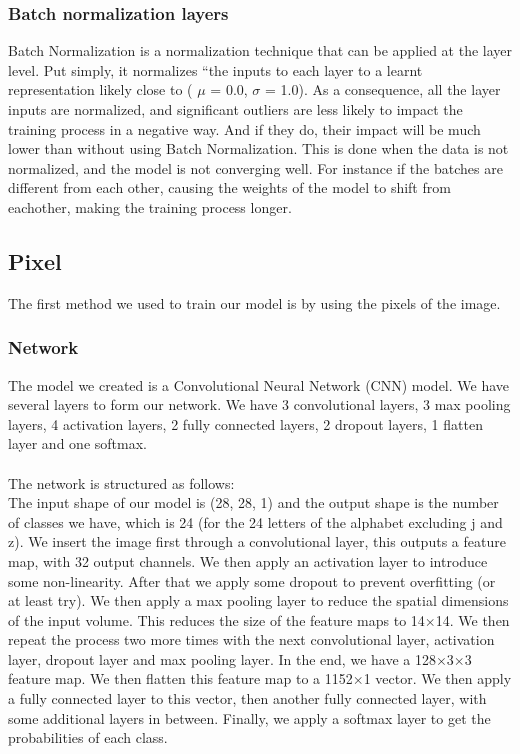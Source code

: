 \documentclass[../paper.tex]{subfiles}
\begin{document}
    \subsubsection{Batch normalization layers}
    Batch Normalization is a normalization technique that can be applied at the layer level. 
    Put simply, it normalizes “the inputs to each layer to a learnt representation likely close to ( $\mu$ = 0.0, $\sigma$ = 1.0). 
    As a consequence, all the layer inputs are normalized, and significant outliers are less likely to impact the training process in a negative way. 
    And if they do, their impact will be much lower than without using Batch Normalization.\cite{o17}
    This is done when the data is not normalized, and the model is not converging well.
    For instance if the batches are different from each other, causing the weights of the model to shift from eachother, making the training process longer.

    \subsection{Pixel}
    The first method we used to train our model is by using the pixels of the image.
    \subsubsection{Network}
    The model we created is a Convolutional Neural Network (CNN) model.
    We have several layers to form our network. 
    We have 3 convolutional layers, 3 max pooling layers, 4 activation layers, 2 fully connected layers, 2 dropout layers, 1 flatten layer and one softmax.
    \\\\
    The network is structured as follows:\\
    The input shape of our model is (28, 28, 1) and the output shape is the number of classes we have, which is 24 (for the 24 letters of the alphabet excluding j and z).
    We insert the image first through a convolutional layer, this outputs a feature map, with 32 output channels.
    We then apply an activation layer to introduce some non-linearity.
    After that we apply some dropout to prevent overfitting (or at least try).
    We then apply a max pooling layer to reduce the spatial dimensions of the input volume. This reduces the size of the feature maps to 14$\times$14.
    We then repeat the process two more times with the next convolutional layer, activation layer, dropout layer and max pooling layer.
    In the end, we have a 128$\times$3$\times$3 feature map. We then flatten this feature map to a 1152$\times$1 vector.
    We then apply a fully connected layer to this vector, then another fully connected layer, with some additional layers in between.
    Finally, we apply a softmax layer to get the probabilities of each class.
    
\end{document}
